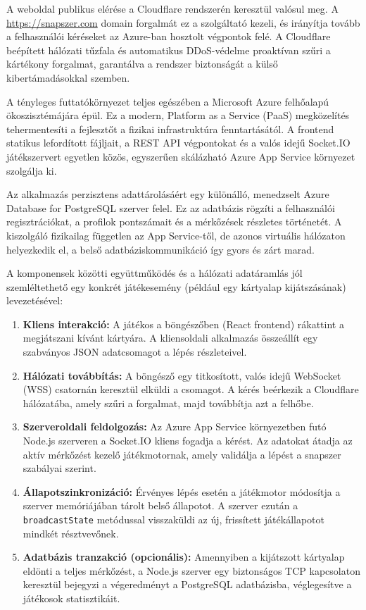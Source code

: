 A weboldal publikus elérése a Cloudflare \cite{cloudflare} rendszerén keresztül valósul meg. A \url{https://snapszer.com} domain forgalmát ez a szolgáltató kezeli, és irányítja tovább a felhasználói kéréseket az Azure-ban hosztolt végpontok felé. A Cloudflare beépített hálózati tűzfala és automatikus DDoS-védelme proaktívan szűri a kártékony forgalmat, garantálva a rendszer biztonságát a külső kibertámadásokkal szemben.

A tényleges futtatókörnyezet teljes egészében a Microsoft Azure \cite{azure} felhőalapú ökoszisztémájára épül. Ez a modern, Platform as a Service (PaaS) megközelítés tehermentesíti a fejlesztőt a fizikai infrastruktúra fenntartásától. A frontend statikus lefordított fájljait, a REST API végpontokat és a valós idejű Socket.IO játékszervert egyetlen közös, egyszerűen skálázható Azure App Service környezet szolgálja ki.

Az alkalmazás perzisztens adattárolásáért egy különálló, menedzselt Azure Database for PostgreSQL szerver felel. Ez az adatbázis rögzíti a felhasználói regisztrációkat, a profilok pontszámait és a mérkőzések részletes történetét. A kiszolgáló fizikailag független az App Service-től, de azonos virtuális hálózaton helyezkedik el, a belső adatbáziskommunikáció így gyors és zárt marad.

A komponensek közötti együttműködés és a hálózati adatáramlás  jól szemléltethető egy konkrét játékesemény (például egy kártyalap kijátszásának) levezetésével:

\begin{enumerate}
    \item \textbf{Kliens interakció:} A játékos a böngészőben (React frontend) rákattint a megjátszani kívánt kártyára. A kliensoldali alkalmazás összeállít egy szabványos JSON adatcsomagot a lépés részleteivel.
    \item \textbf{Hálózati továbbítás:} A böngésző egy titkosított, valós idejű WebSocket (WSS) csatornán keresztül elküldi a csomagot. A kérés beérkezik a Cloudflare hálózatába, amely szűri a forgalmat, majd továbbítja azt a felhőbe.
    \item \textbf{Szerveroldali feldolgozás:} Az Azure App Service környezetben futó Node.js szerveren a Socket.IO kliens fogadja a kérést. Az adatokat átadja az aktív mérkőzést kezelő játékmotornak, amely validálja a lépést a snapszer szabályai szerint.
    \item \textbf{Állapotszinkronizáció:} Érvényes lépés esetén a játékmotor módosítja a szerver memóriájában tárolt belső állapotot. A szerver ezután a \texttt{broadcastState} metódussal visszaküldi az új, frissített játékállapotot mindkét résztvevőnek.
    \item \textbf{Adatbázis tranzakció (opcionális):} Amennyiben a kijátszott kártyalap eldönti a teljes mérkőzést, a Node.js szerver egy biztonságos TCP kapcsolaton keresztül bejegyzi a végeredményt a PostgreSQL adatbázisba, véglegesítve a játékosok statisztikáit.
\end{enumerate}


